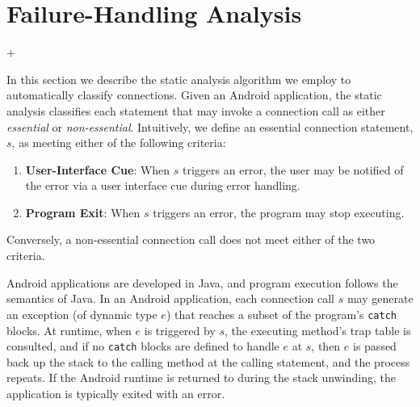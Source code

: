 \section{Failure-Handling Analysis}
\label{sec:analysis}

\lstMakeShortInline[basicstyle=\scriptsize\ttfamily,keywordstyle=\color{DarkPurple},breaklines=false]+

In this section we describe the static analysis algorithm we employ to
automatically classify connections.  Given an Android application, the
static analysis classifies each statement that may invoke a
connection call as either {\it essential} or {\it non-essential}.
Intuitively, we define an essential connection statement, $s$, as
meeting either of the following criteria:
\vspace{-0.05in}
\begin{enumerate}[leftmargin=0.5cm]\setlength{\itemsep}{-0.05in}
\item{\bf User-Interface Cue}: When $s$ triggers an error, the user
may be notified of the error via a user interface cue during error
handling.
\item {\bf Program Exit}: When $s$ triggers an error, the program 
   may stop executing.  
\end{enumerate}
\vspace{-0.05in}
\noindent Conversely, a non-essential connection call does not meet
either of the two criteria.  

Android applications are developed in Java, and program execution
follows the semantics of Java. In an Android application, each
connection call $s$ may generate an exception (of dynamic type $e$)
that reaches a subset of the program's \lstinline!catch! blocks.  At
runtime, when $e$ is triggered by $s$, the executing method's trap
table is consulted, and if no \lstinline!catch! blocks are defined to
handle $e$ at $s$, then $e$ is passed back up the stack to the
calling method at the calling statement, and the process repeats.  If
the Android runtime is returned to during the stack unwinding, the
application is typically exited with an error.  


